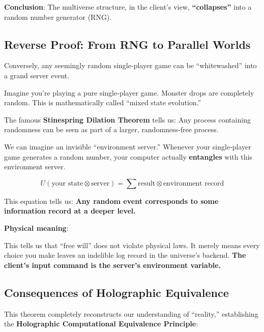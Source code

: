 \textbf{Conclusion}: The multiverse structure, in the client's view, \textbf{``collapses''} into a random number generator (RNG).

\subsection{Reverse Proof: From RNG to Parallel Worlds}

Conversely, any seemingly random single-player game can be ``whitewashed'' into a grand server event.

Imagine you're playing a pure single-player game. Monster drops are completely random. This is mathematically called ``mixed state evolution.''

The famous \textbf{Stinespring Dilation Theorem} tells us: Any process containing randomness can be seen as part of a larger, randomness-free process.

We can imagine an invisible ``environment server.'' Whenever your single-player game generates a random number, your computer actually \textbf{entangles} with this environment server.

\[
U (\text{your state} \otimes \text{server}) = \sum \text{result} \otimes \text{environment record}
\]

This equation tells us: \textbf{Any random event corresponds to some information record at a deeper level.}

\textbf{Physical meaning}:

This tells us that ``free will'' does not violate physical laws. It merely means every choice you make leaves an indelible log record in the universe's backend. \textbf{The client's input command is the server's environment variable.}

\subsection{Consequences of Holographic Equivalence}

This theorem completely reconstructs our understanding of ``reality,'' establishing the \textbf{Holographic Computational Equivalence Principle}:

